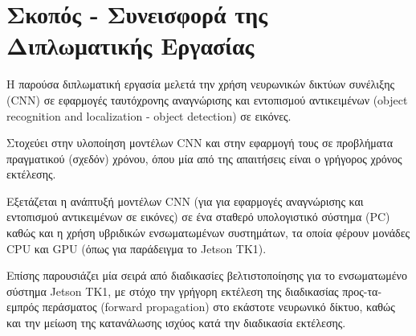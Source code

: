 \section{Σκοπός - Συνεισφορά της Διπλωματικής Εργασίας}
\label{section:contribution}

Η παρούσα διπλωματική εργασία μελετά την χρήση νευρωνικών δικτύων συνέλιξης (CNN)
σε εφαρμογές ταυτόχρονης αναγνώρισης και εντοπισμού αντικειμένων
(object recognition and localization - object detection) σε εικόνες.

Στοχεύει στην υλοποίηση μοντέλων CNN και στην εφαρμογή τους σε προβλήματα πραγματικού (σχεδόν)
χρόνου, όπου μία από της απαιτήσεις είναι ο γρήγορος χρόνος εκτέλεσης.

Εξετάζεται η ανάπτυξή μοντέλων CNN (για για εφαρμογές αναγνώρισης και εντοπισμού αντικειμένων σε εικόνες)
σε ένα σταθερό υπολογιστικό σύστημα (PC)
καθώς και η χρήση υβριδικών ενσωματωμένων συστημάτων, τα οποία
φέρουν μονάδες CPU και GPU (όπως για παράδειγμα το Jetson TK1).

Επίσης παρουσιάζει μία σειρά από διαδικασίες βελτιστοποίησης για το
ενσωματωμένο σύστημα Jetson TK1, με στόχο την γρήγορη εκτέλεση
της διαδικασίας προς-τα-εμπρός περάσματος (forward propagation) στο εκάστοτε νευρωνικό δίκτυο,
καθώς και την μείωση της κατανάλωσης ισχύος κατά την διαδικασία εκτέλεσης.

